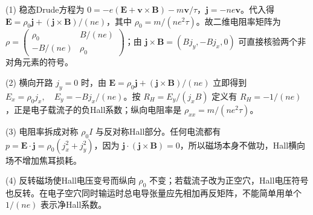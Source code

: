 (1) 稳态Drude方程为 \(0=-e(\mathbf E+\mathbf v\times\mathbf B)-m\mathbf v/\tau\)，\(\mathbf j=-ne\mathbf v\)。代入得 \(\mathbf E=\rho_0\mathbf j+(\mathbf j\times\mathbf B)/(ne)\)，其中 \(\rho_0=m/(ne^2\tau)\)。故二维电阻率矩阵为 \(\rho=\begin{pmatrix}\rho_0&B/(ne)\\-B/(ne)&\rho_0\end{pmatrix}\)；由 \(\mathbf j\times\mathbf B=(Bj_y,-Bj_x,0)\) 可直接核验两个非对角元素的符号。

(2) 横向开路 \(j_y=0\) 时，由 \(\mathbf E=\rho_0\mathbf j+(\mathbf j\times\mathbf B)/(ne)\) 立即得到 \(\boxed{E_x=\rho_0j_x,\quad E_y=-Bj_x/(ne)}\)。按 \(R_H=E_y/(j_xB)\) 定义有 \(\boxed{R_H=-1/(ne)}\)，正是电子载流子的负Hall系数；纵向电阻率是 \(\rho_{xx}=m/(ne^2\tau)\)。

(3) 电阻率拆成对称 \(\rho_0I\) 与反对称Hall部分。任何电流都有 \(p=\mathbf E\cdot\mathbf j=\rho_0(j_x^2+j_y^2)\)，因为 \(\mathbf j\cdot(\mathbf j\times\mathbf B)=0\)，所以磁场本身不做功，Hall横向场不增加焦耳损耗。

(4) 反转磁场使Hall电压变号而纵向 \(\rho_0\) 不变；若载流子改为正空穴，Hall电压符号也反转。在电子空穴同时输运时总电导张量应先相加再反矩阵，不能简单用单个 \(1/(ne)\) 表示净Hall系数。
